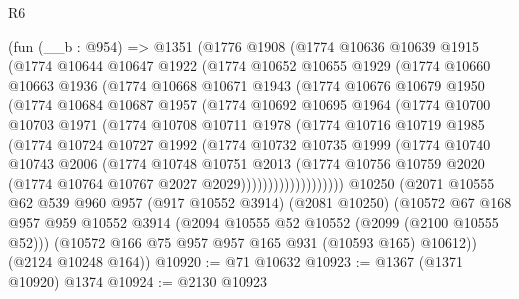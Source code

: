 \begin{lexlean}{R6}
\begin{coremodule}
    (fun (__b : @954) =>
    @1351
      (@1776
        @1908
        (@1774
          @10636
          @10639
          @1915
          (@1774
            @10644
            @10647
            @1922
            (@1774
              @10652
              @10655
              @1929
              (@1774
                @10660
                @10663
                @1936
                (@1774
                  @10668
                  @10671
                  @1943
                  (@1774
                    @10676
                    @10679
                    @1950
                    (@1774
                      @10684
                      @10687
                      @1957
                      (@1774
                        @10692
                        @10695
                        @1964
                        (@1774
                          @10700
                          @10703
                          @1971
                          (@1774
                            @10708
                            @10711
                            @1978
                            (@1774
                              @10716
                              @10719
                              @1985
                              (@1774
                                @10724
                                @10727
                                @1992
                                (@1774
                                  @10732
                                  @10735
                                  @1999
                                  (@1774
                                    @10740
                                    @10743
                                    @2006
                                    (@1774
                                      @10748
                                      @10751
                                      @2013
                                      (@1774
                                        @10756
                                        @10759
                                        @2020
                                        (@1774 @10764 @10767 @2027 @2029)))))))))))))))))))
    @10250
    (@2071
      @10555
      @62
      @539
      @960
      @957
      (@917 @10552 @3914)
      (@2081 @10250)
      (@10572
        @67
        @168
        @957
        @959
        @10552
        @3914
        (@2094 @10555 @52 @10552 (@2099 (@2100 @10555 @52)))
        (@10572 @166 @75 @957 @957 @165 @931 (@10593 @165) @10612))
      (@2124 @10248 @164))
@10920 := @71 @10632
@10923 := @1367 (@1371 @10920) @1374
@10924 := @2130 @10923

\end{coremodule}
\end{lexlean}
